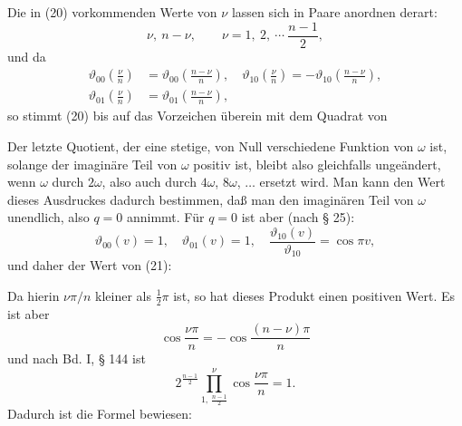 Die in (20) vorkommenden Werte von $\nu$ lassen sich in Paare anordnen derart:
\[
\nu,\ n-\nu, \qquad \nu = 1,\ 2,\ \cdots\ \frac{n-1}{2},
\]
und da
\[
\begin{aligned}
\vartheta_{00}\left(\frac{\nu}{n}\right) &= \vartheta_{00}\left(\frac{n-\nu}{n}\right), \quad \vartheta_{10}\left(\frac{\nu}{n}\right) = -\vartheta_{10}\left(\frac{n-\nu}{n}\right), \\
\vartheta_{01}\left(\frac{\nu}{n}\right) &= \vartheta_{01}\left(\frac{n-\nu}{n}\right),
\end{aligned}
\]
so stimmt (20) bis auf das Vorzeichen überein mit dem Quadrat von


Der letzte Quotient, der eine stetige, von Null verschiedene Funktion von $\omega$ ist, solange der imaginäre Teil von $\omega$ positiv ist, bleibt also gleichfalls ungeändert, wenn $\omega$ durch $2\omega$, also auch durch $4\omega$, $8\omega$, $\ldots$ ersetzt wird. Man kann den Wert dieses Ausdruckes dadurch bestimmen, daß man den imaginären Teil von $\omega$ unendlich, also $q=0$ annimmt. Für $q=0$ ist aber (nach § 25):
\[
\vartheta_{00}(v) = 1, \quad \vartheta_{01}(v) = 1, \quad \frac{\vartheta_{10}(v)}{\vartheta_{10}} = \cos\pi v,
\]
und daher der Wert von (21):


Da hierin $\nu\pi/n$ kleiner als $\frac{1}{2}\pi$ ist, so hat dieses Produkt einen positiven Wert. Es ist aber
\[
\cos\frac{\nu\pi}{n} = -\cos\frac{(n-\nu)\pi}{n}
\]
und nach Bd. I, § 144 ist
\[
2^{\frac{n-1}{2}} \prod_{1,\,\frac{n-1}{2}}^{\nu} \cos\frac{\nu\pi}{n} = 1.
\]
Dadurch ist die Formel bewiesen:


